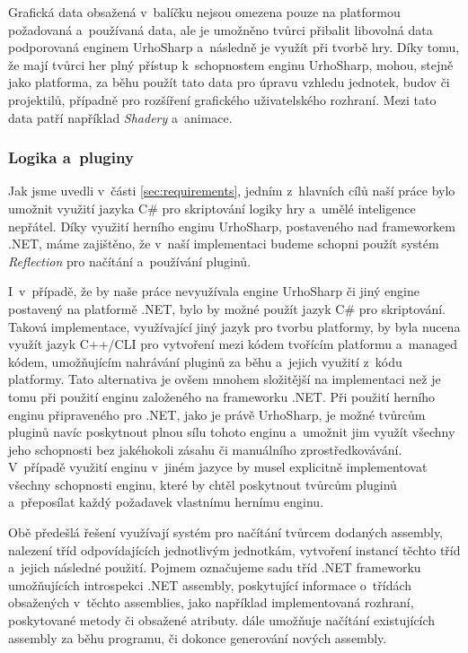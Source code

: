 Grafická data obsažená v~balíčku nejsou omezena pouze na platformou požadovaná a~používaná data, ale je umožněno tvůrci přibalit libovolná data podporovaná enginem UrhoSharp a~následně je využít při tvorbě hry. Díky tomu, že mají tvůrci her plný přístup k~schopnostem enginu UrhoSharp, mohou, stejně jako platforma, za běhu použít tato data pro úpravu vzhledu jednotek, budov či projektilů, případně pro rozšíření grafického uživatelského rozhraní. Mezi tato data patří například \textit{Shadery} a~animace.

\subsubsection{Logika a~pluginy}
\label{sec:logicandplugins}
Jak jsme uvedli v~části \ref{sec:requirements}, jedním z~hlavních cílů naší práce bylo umožnit využití jazyka C\# pro skriptování logiky hry a~umělé inteligence nepřátel. Díky využití herního enginu UrhoSharp, postaveného nad frameworkem .NET, máme zajištěno, že v~naší implementaci budeme schopni použít systém \textit{Reflection} pro načítání a~používání pluginů. 

I~v~případě, že by naše práce nevyužívala engine UrhoSharp či jiný engine postavený na platformě .NET, bylo by možné použít jazyk C\# pro skriptování. Taková implementace, využívající jiný jazyk pro tvorbu platformy, by byla nucena využít jazyk C++/CLI pro vytvoření   mezi kódem tvořícím platformu a~managed kódem, umožňujícím nahrávání pluginů za běhu a~jejich využití z~kódu platformy. Tato alternativa je ovšem mnohem složitější na implementaci než je tomu při použití enginu založeného na frameworku .NET. Při použití herního enginu připraveného pro .NET, jako je právě UrhoSharp, je možné tvůrcům pluginů navíc poskytnout plnou sílu tohoto enginu a~umožnit jim využít všechny jeho schopnosti bez jakéhokoli zásahu či manuálního zprostředkovávání. V~případě využití enginu v~jiném jazyce by musel   explicitně implementovat všechny schopnosti enginu, které by chtěl poskytnout tvůrcům pluginů a~přeposílat každý požadavek vlastnímu hernímu enginu.

Obě předešlá řešení využívají systém   pro načítání tvůrcem dodaných assembly, nalezení tříd odpovídajících jednotlivým jednotkám, vytvoření instancí těchto tříd a~jejich následné použití. Pojmem   označujeme sadu tříd .NET frameworku umožňujících introspekci .NET assembly, poskytující informace o~třídách obsažených v~těchto assemblies, jako například implementovaná rozhraní, poskytované metody či obsažené atributy.   dále umožňuje načítání existujících assembly za běhu programu, či dokonce generování nových assembly. 

